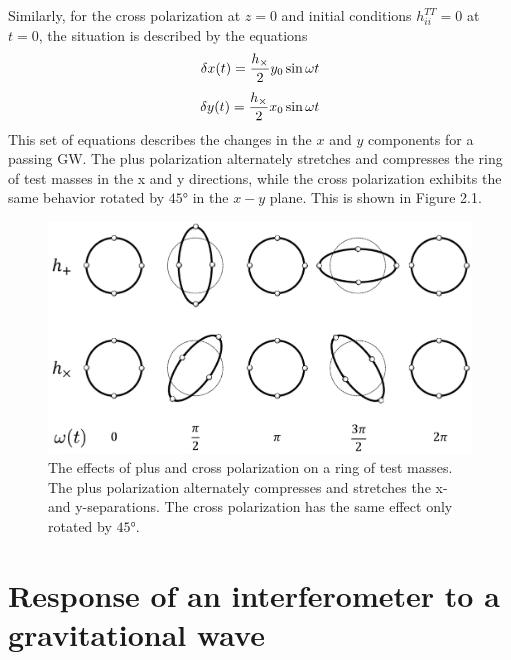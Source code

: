 \documentclass[binding=0.6cm, LaM]{sapthesis}
\begin{document}
        Similarly, for the cross polarization at $z=0$ and initial conditions $h_{ii}^{TT} = 0$ at $t= 0$, the situation is described by the equations
                \begin{equation}
                	\delta x(t) =  {{h_{\times}} \over 2} y_0 \sin \omega t
                \end{equation}
                \begin{equation}
                	\delta y(t) =  {{h_{\times}} \over 2} x_0  \sin \omega t
                \end{equation}
        This set of equations describes the changes in the $x$ and $y$ components for a passing GW.
        The plus polarization alternately stretches and compresses the ring of test masses in the x and y directions,
        while the cross polarization exhibits the same behavior rotated by $\ang{45}$ in the $x - y$ plane. This is shown in Figure 2.1.
                \begin{figure}[H]
                \label{ring}
                \includegraphics[scale=1]{ring}
                \centering
                \caption{The effects of plus and cross polarization on a ring of test masses.
                         The plus polarization alternately compresses and stretches the x- and y-separations.
                         The cross polarization has the same effect only rotated by  $\ang{45}$.}
                \label{fig:ring}
                \end{figure}

\section{Response of an interferometer to a gravitational wave}
\end{document}
